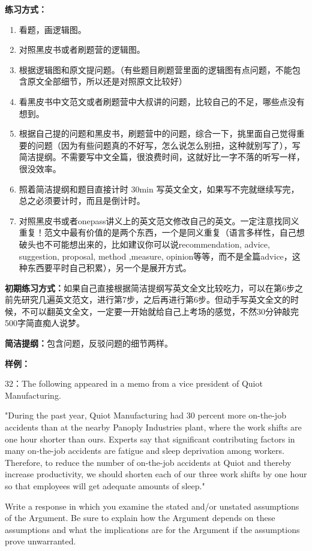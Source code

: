 \documentclass[cn,plain]{./src/qyxfbook}
\begin{document}
			\textbf{练习方式：}\par
			\begin{enumerate}
			\item 看题，画逻辑图。
			\item 对照黑皮书或者刷题营的逻辑图。
			\item 根据逻辑图和原文提问题。（有些题目刷题营里面的逻辑图有点问题，不能包含原文全部细节，所以还是对照原文比较好）
			\item 看黑皮书中文范文或者刷题营中大叔讲的问题，比较自己的不足，哪些点没有想到。
			\item 根据自己提的问题和黑皮书，刷题营中的问题，综合一下，挑里面自己觉得重要的问题（因为有些问题真的不好写，怎么说怎么别扭，这种就别写了），写简洁提纲。不需要写中文全篇，很浪费时间，这就好比一字不落的听写一样，很没效率。
			\item 照着简洁提纲和题目直接计时 30min 写英文全文，如果写不完就继续写完，总之必须要计时，而且是倒计时。
			\item 对照黑皮书或者onepass讲义上的英文范文修改自己的英文。一定注意找同义重复！范文中最有价值的是两个东西，一个是同义重复（语言多样性，自己想破头也不可能想出来的，比如建议你可以说recommendation, advice, suggestion, proposal, method ,measure, opinion等等，而不是全篇advice，这种东西要平时自己积累），另一个是展开方式。
			\end{enumerate}
			\textbf{初期练习方式：}如果自己直接根据简洁提纲写英文全文比较吃力，可以在第6步之前先研究几遍英文范文，进行第7步，之后再进行第6步。但动手写英文全文的时候，不可以翻英文全文，一定要一开始就给自己上考场的感觉，不然30分钟敲完500字简直痴人说梦。\par
			\setlength{\leftskip}{0em}
			\textbf{简洁提纲：}包含问题，反驳问题的细节两样。

			\textbf{样例：}

			32：The following appeared in a memo from a vice president of Quiot Manufacturing.\par
			"During the past year, Quiot Manufacturing had 30 percent more on-the-job accidents than at the nearby Panoply Industries plant, where the work shifts are one hour shorter than ours. Experts say that significant contributing factors in many on-the-job accidents are fatigue and sleep deprivation among workers. Therefore, to reduce the number of on-the-job accidents at Quiot and thereby increase productivity, we should shorten each of our three work shifts by one hour so that employees will get adequate amounts of sleep."\par
			Write a response in which you examine the stated and/or unstated assumptions of the Argument. Be sure to explain how the Argument depends on these assumptions and what the implications are for the Argument if the assumptions prove unwarranted.
\end{document}
